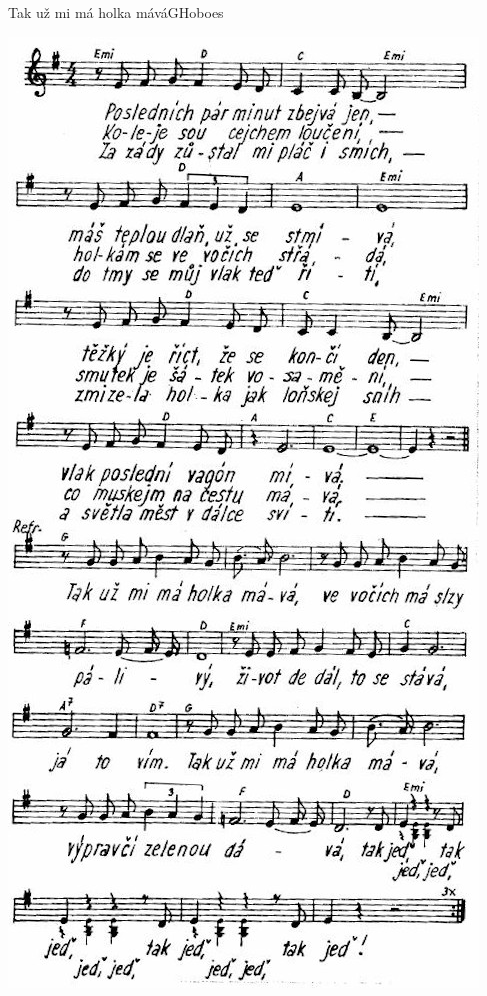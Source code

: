 \setcounter{page}{84}
\begin{song}{Tak už mi má holka mává}{G}{Hoboes}
\begin{center}
\includegraphics[height=0.9\textheight]{noty/a_tak-už-mi-má-holka-mává} 
\end{center}
\end{song} \pagebreak
